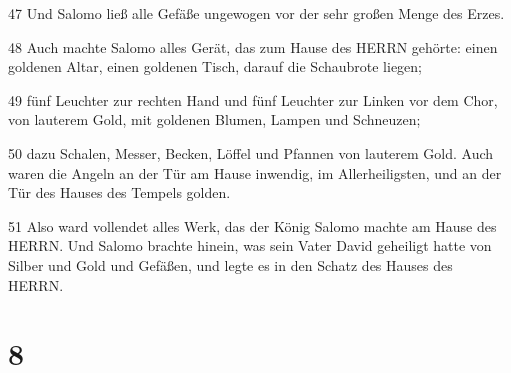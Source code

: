 \par 47 Und Salomo ließ alle Gefäße ungewogen vor der sehr großen Menge des Erzes.
\par 48 Auch machte Salomo alles Gerät, das zum Hause des HERRN gehörte: einen goldenen Altar, einen goldenen Tisch, darauf die Schaubrote liegen;
\par 49 fünf Leuchter zur rechten Hand und fünf Leuchter zur Linken vor dem Chor, von lauterem Gold, mit goldenen Blumen, Lampen und Schneuzen;
\par 50 dazu Schalen, Messer, Becken, Löffel und Pfannen von lauterem Gold. Auch waren die Angeln an der Tür am Hause inwendig, im Allerheiligsten, und an der Tür des Hauses des Tempels golden.
\par 51 Also ward vollendet alles Werk, das der König Salomo machte am Hause des HERRN. Und Salomo brachte hinein, was sein Vater David geheiligt hatte von Silber und Gold und Gefäßen, und legte es in den Schatz des Hauses des HERRN.

\chapter{8}


